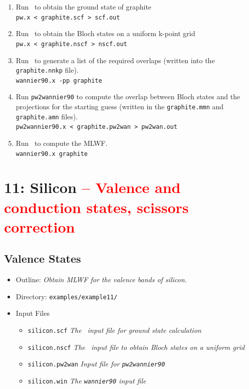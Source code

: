 \documentclass[a4paper,11pt,twoside]{article}
\def\tent#1{\textcolor{red}{#1}}     %
\begin{document}
\begin{enumerate}
\item Run \pwscf\ to obtain the ground state of graphite\\
{\tt pw.x < graphite.scf > scf.out}

\item Run \pwscf\ to obtain the Bloch states on a uniform k-point grid\\
{\tt pw.x < graphite.nscf > nscf.out}

\item Run \wannier\ to generate a list of the required overlaps (written
  into the {\tt graphite.nnkp} file).\\ 
{\tt wannier90.x -pp graphite}

\item Run {\tt pw2wannier90} to compute the overlap between Bloch
  states and the projections for the starting guess (written in the
  {\tt graphite.mmn} and {\tt graphite.amn} files).\\  
{\tt pw2wannier90.x < graphite.pw2wan > pw2wan.out}

\item Run \wannier\ to compute the MLWF.\\
{\tt wannier90.x graphite}
\end{enumerate}


\cleardoublepage


\section*{11: Silicon \tent{-- Valence and conduction states, scissors correction}}
\subsection*{Valence States}
\begin{itemize}
\item{Outline: \it{Obtain MLWF for the valence bands of silicon.}}
\item{Directory: {\tt examples/example11/}}
\item{Input Files}
\begin{itemize}
\item{ {\tt silicon.scf}  {\it The \pwscf\ input file for ground state
    calculation}} 
\item{ {\tt silicon.nscf}  {\it The \pwscf\ input file to obtain Bloch
    states on a uniform grid}} 
\item{ {\tt silicon.pw2wan}  {\it Input file for {\tt pw2wannier90}}}
\item{ {\tt silicon.win}  {\it The {\tt wannier90} input file}}
\end{itemize}

\end{itemize}
\end{document}
